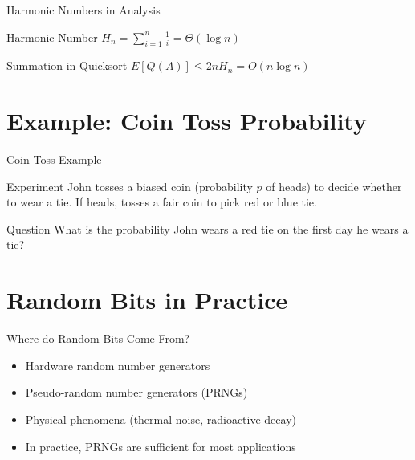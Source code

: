 \documentclass[aspectratio=169]{beamer}
\begin{document}
\begin{frame}{Harmonic Numbers in Analysis}
  \begin{block}{Harmonic Number}
    $H_n = \sum_{i=1}^n \frac{1}{i} = \Theta(\log n)$
  \end{block}
  \pause
  \begin{block}{Summation in Quicksort}
    $E[Q(A)] \leq 2nH_n = O(n \log n)$
  \end{block}
\end{frame}

\section{Example: Coin Toss Probability}
\begin{frame}{Coin Toss Example}
  \begin{block}{Experiment}
    John tosses a biased coin (probability $p$ of heads) to decide whether to wear a tie. If heads, tosses a fair coin to pick red or blue tie.
  \end{block}
  \pause
  \begin{block}{Question}
    What is the probability John wears a red tie on the first day he wears a tie?
  \end{block}
  \pause
  \begin{center}
  \end{center}
\end{frame}

\section{Random Bits in Practice}
\begin{frame}{Where do Random Bits Come From?}
  \begin{itemize}
    \item Hardware random number generators
          \pause
    \item Pseudo-random number generators (PRNGs)
          \pause
    \item Physical phenomena (thermal noise, radioactive decay)
          \pause
    \item In practice, PRNGs are sufficient for most applications
  \end{itemize}
\end{frame}
\end{document}

